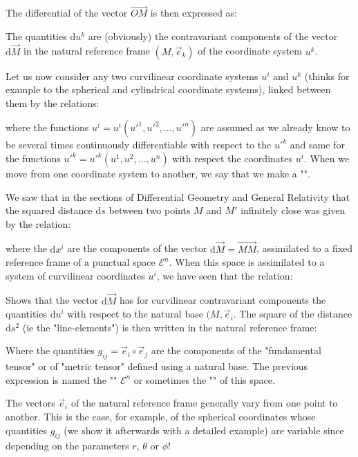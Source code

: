 	The differential of the vector $\overrightarrow{OM}$ is then expressed as:
	
	The quantities $\mathrm{d}u^k$ are (obviously) the contravariant components of the vector $\mathrm{d}\vec{M}$ in the natural reference frame $(M,\vec{e}_k)$ of the coordinate system $u^k$.
	
	Let us now consider any two curvilinear coordinate systems $u^i$ and $u^k$ (thinks for example to the spherical and cylindrical coordinate systems), linked between them by the relations:
	
	where the functions $u^i=u^i({u'}^1,{u'}^2,\ldots,{u'}^n)$ are assumed as we already know to be several times continuously differentiable with respect to the ${u'}^k$ and same for the functions ${u'}^k={u'}^k(u^1,u^2,\ldots,u^n)$ with respect the coordinates $u^i$. When we move from one coordinate system to another, we say that we make a "".
	
	We saw that in the sections of Differential Geometry and General Relativity that the squared distance $\mathrm{d}s$ between two points $M$ and $M'$ infinitely close was given by the relation:
	
	where the $\mathrm{d}x^i$ are the components of the vector $\mathrm{d}\vec{M}=\overrightarrow{MM}$, assimilated to a fixed reference frame of a punctual space $\mathcal{E}^n$. When this space is assimilated to a system of curvilinear coordinates $u^i$, we have seen that the relation:
	
	Shows that the vector $\mathrm{d}\vec{M}$ has for curvilinear contravariant components the quantities $\mathrm{d}u^i$ with respect to the natural base $(M,\vec{e}_i$. The square of the distance $\mathrm{d}s^2$ (ie the "line-elements") is then written in the natural reference frame:
	
	Where the quantities $g_{ij}=\vec{e}_i\circ\vec{e}_j$ are the components of the "fundamental tensor" or of "metric tensor" defined using a natural base. The previous expression is named the  "" $\mathcal{E}^n$ or sometimes the "" of this space.
	
	The vectors $\vec{e}_i$ of the natural reference frame generally vary from one point to another. This is the case, for example, of the spherical coordinates whose quantities $g_{ij}$ (we show it afterwards with a detailed example) are variable since depending on the parameters $r$, $\theta$ or $\phi$!
	
